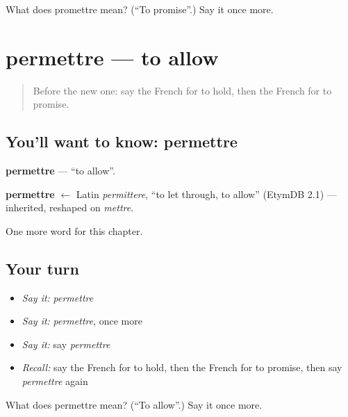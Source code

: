 \begin{tcolorbox}[breakable,colback=teal!4,colframe=teal!35!black,title={Before you move on}]
What does promettre mean? (\textquotedblleft{}To promise\textquotedblright{}.) Say it once more.
\end{tcolorbox}
\section[permettre]{permettre — to allow}

\label{lesson:FR-C177-permettre}



\begin{quote}
Before the new one: say the French for to hold, then the French for to promise.
\end{quote}

\subsection*{You'll want to know: permettre}
\textbf{permettre} — \textquotedblleft{}to allow\textquotedblright{}.

\begin{cousinweb}
\textbf{permettre} $\leftarrow$ Latin \emph{permittere}, \textquotedblleft{}to let through, to allow\textquotedblright{} (EtymDB 2.1) — inherited, reshaped on \emph{mettre}.
\end{cousinweb}

\begin{grammarlens}[title={What you've built}]
One more word for this chapter.
\end{grammarlens}

\subsection*{Your turn}
\begin{itemize}
\raggedright
  \item \emph{Say it:} \emph{permettre}
  \item \emph{Say it:} \emph{permettre}, once more
  \item \emph{Say it:} say \emph{permettre}
  \item \emph{Recall:} say the French for to hold, then the French for to promise, then say \emph{permettre} again
\end{itemize}

\begin{tcolorbox}[breakable,colback=teal!4,colframe=teal!35!black,title={Before you move on}]
What does permettre mean? (\textquotedblleft{}To allow\textquotedblright{}.) Say it once more.
\end{tcolorbox}
